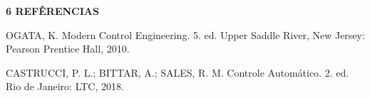 \noindent \textcolor{myBlue}{\textbf{\large{6 REFÊRENCIAS }}}\\



\begin{flushleft}

OGATA, K. Modern Control Engineering. 5. ed. Upper Saddle River, New Jersey: Pearson Prentice Hall, 2010. \vspace{0,5cm}


CASTRUCCI, P. L.; BITTAR, A.; SALES, R. M. Controle Automático. 2. ed. Rio de Janeiro: LTC, 2018.

\end{flushleft}